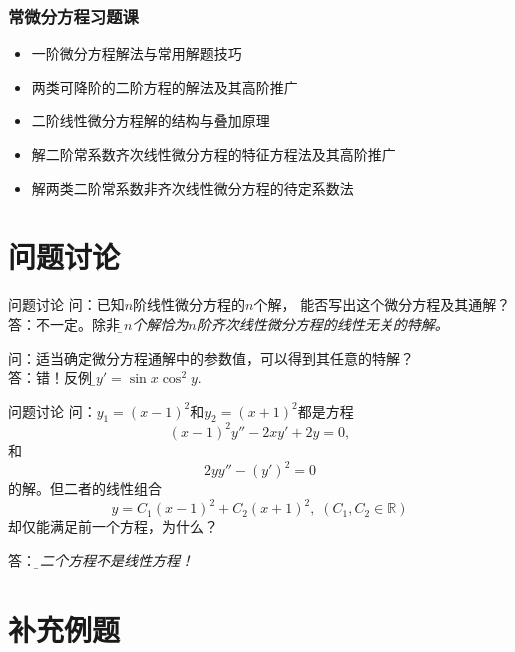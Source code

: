 
\begin{frame}
	\frametitle{常微分方程习题课}
	\linespread{1.5}
	  \begin{itemize}
	    \item 一阶微分方程解法与常用解题技巧
	    \item 两类可降阶的二阶方程的解法及其高阶推广
	    \item 二阶线性微分方程解的结构与叠加原理
	    \item 解二阶常系数齐次线性微分方程的特征方程法及其高阶推广
	    \item 解两类二阶常系数非齐次线性微分方程的待定系数法
	  \end{itemize}
\end{frame}

\section{问题讨论}

\begin{frame}{问题讨论}
	\linespread{1.5}
	\alert{问：}已知$n$阶线性微分方程的$n$个解，
	能否写出这个微分方程及其通解？\pause\\[1ex]
	
	\alert{答：}不一定。\pause 除非{\it\b 
	这$n$个解恰为$n$阶齐次线性微分方程的线性无关的特解。} \pause 
	
	\bigskip
	\alert{问：}适当确定微分方程通解中的参数值，可以得到其任意的特解？\pause \\[1ex]
	
	\alert{答：}错！\pause 反例：{\b $y'=\sin x\cos^2y$}.
\end{frame}

\begin{frame}{问题讨论}
	\linespread{1.2}
	\alert{问：}$y_1=(x-1)^2$和$y_2=(x+1)^2$都是方程
	$$(x-1)^2y''-2xy'+2y=0,$$
	和
	$$2yy''-(y')^2=0$$
	的解。但二者的线性组合
	$$y=C_1(x-1)^2+C_2(x+1)^2,\;(C_1,C_2\in\mathbb{R})$$
	却仅能满足前一个方程，为什么？\pause 
	
	\alert{答：}{\it\b 第二个方程不是线性方程！}
\end{frame}

\section{补充例题}

